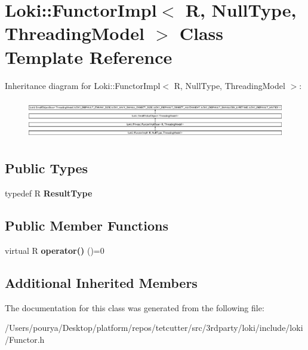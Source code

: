 \hypertarget{classLoki_1_1FunctorImpl_3_01R_00_01NullType_00_01ThreadingModel_01_4}{}\section{Loki\+:\+:Functor\+Impl$<$ R, Null\+Type, Threading\+Model $>$ Class Template Reference}
\label{classLoki_1_1FunctorImpl_3_01R_00_01NullType_00_01ThreadingModel_01_4}
Inheritance diagram for Loki\+:\+:Functor\+Impl$<$ R, Null\+Type, Threading\+Model $>$\+:\begin{figure}[H]
\begin{center}
\leavevmode
\includegraphics[height=1.751368cm]{classLoki_1_1FunctorImpl_3_01R_00_01NullType_00_01ThreadingModel_01_4}
\end{center}
\end{figure}
\subsection*{Public Types}
\begin{DoxyCompactItemize}
\item 
\hypertarget{classLoki_1_1FunctorImpl_3_01R_00_01NullType_00_01ThreadingModel_01_4_aff3e2540dcec804c7feac3e171685606}{}typedef R {\bfseries Result\+Type}\label{classLoki_1_1FunctorImpl_3_01R_00_01NullType_00_01ThreadingModel_01_4_aff3e2540dcec804c7feac3e171685606}

\end{DoxyCompactItemize}
\subsection*{Public Member Functions}
\begin{DoxyCompactItemize}
\item 
\hypertarget{classLoki_1_1FunctorImpl_3_01R_00_01NullType_00_01ThreadingModel_01_4_ab701edfb0aa435a5600c567eddf61578}{}virtual R {\bfseries operator()} ()=0\label{classLoki_1_1FunctorImpl_3_01R_00_01NullType_00_01ThreadingModel_01_4_ab701edfb0aa435a5600c567eddf61578}

\end{DoxyCompactItemize}
\subsection*{Additional Inherited Members}


The documentation for this class was generated from the following file\+:\begin{DoxyCompactItemize}
\item 
/\+Users/pourya/\+Desktop/platform/repos/tetcutter/src/3rdparty/loki/include/loki/Functor.\+h\end{DoxyCompactItemize}
